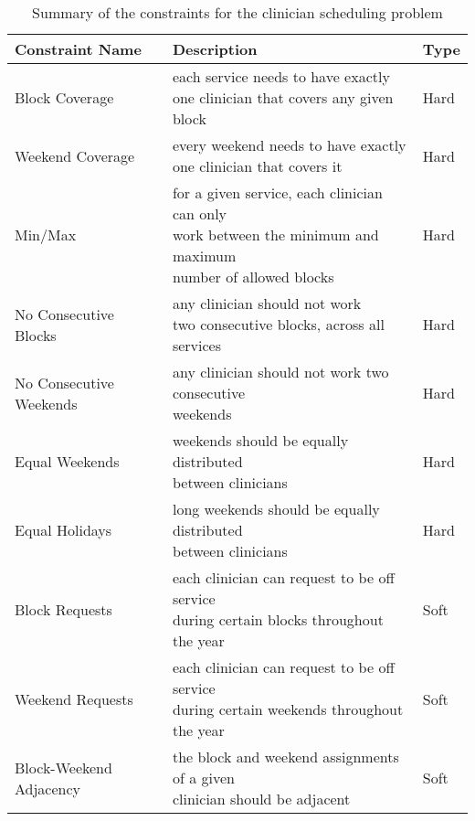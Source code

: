 \begin{table}[h]
	\centering
	\begin{tabular}{ l l l }
		\hline
		\textbf{Constraint Name} & \textbf{Description}                                                                                                           & \textbf{Type} \\ \hline
		Block Coverage           & \makecell[l]{each service needs to have exactly \\ one clinician that covers any given block}                                 & Hard          \\ \hline
		Weekend Coverage         & \makecell[l]{every weekend needs to have exactly \\ one clinician that covers it}                                              & Hard          \\ \hline
		Min/Max                  & \makecell[l]{for a given service, each clinician can only \\ work between the minimum and maximum \\ number of allowed blocks} & Hard          \\ \hline
		No Consecutive Blocks    & \makecell[l]{any clinician should not work \\ two consecutive blocks, across all services}                                    & Hard          \\ \hline
		No Consecutive Weekends  & \makecell[l]{any clinician should not work two consecutive \\ weekends}                                                        & Hard          \\ \hline
		Equal Weekends           & \makecell[l]{weekends should be equally distributed \\ between clinicians}                                                     & Hard          \\ \hline
		Equal Holidays           & \makecell[l]{long weekends should be equally distributed \\ between clinicians}                                                & Hard          \\ \hline
		Block Requests           & \makecell[l]{each clinician can request to be off service \\ during certain blocks throughout the year}                        & Soft          \\ \hline
		Weekend Requests         & \makecell[l]{each clinician can request to be off service \\ during certain weekends throughout the year}                      & Soft          \\ \hline
		Block-Weekend Adjacency  & \makecell[l]{the block and weekend assignments of a given \\ clinician should be adjacent}                                     & Soft
	\end{tabular}
	\caption{Summary of the constraints for the clinician scheduling problem}
	\label{tbl:constraint-summary}
\end{table}


